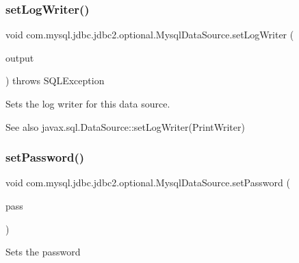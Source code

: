 \subsubsection{\texorpdfstring{set\+Log\+Writer()}{setLogWriter()}}
{\footnotesize\ttfamily void com.\+mysql.\+jdbc.\+jdbc2.\+optional.\+Mysql\+Data\+Source.\+set\+Log\+Writer (\begin{DoxyParamCaption}\item[{Print\+Writer}]{output }\end{DoxyParamCaption}) throws S\+Q\+L\+Exception}

Sets the log writer for this data source.

\begin{DoxySeeAlso}{See also}
javax.\+sql.\+Data\+Source\+::set\+Log\+Writer(\+Print\+Writer) 
\end{DoxySeeAlso}
\mbox{\label{classcom_1_1mysql_1_1jdbc_1_1jdbc2_1_1optional_1_1_mysql_data_source_ade391cdd38bff8de57b9ef65d62200d1}} 
\subsubsection{\texorpdfstring{set\+Password()}{setPassword()}}
{\footnotesize\ttfamily void com.\+mysql.\+jdbc.\+jdbc2.\+optional.\+Mysql\+Data\+Source.\+set\+Password (\begin{DoxyParamCaption}\item[{String}]{pass }\end{DoxyParamCaption})}

Sets the password


